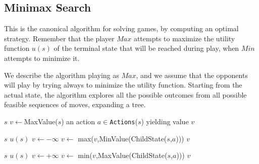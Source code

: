 \documentclass[10pt, letterpaper]{report}
\begin{document}
\subsection{Minimax Search}
This is the canonical algorithm for solving games, by computing an optimal strategy. Remember that the player $Max$ attempts to maximize the utility function $u(s)$ of the terminal state that will be reached during play, when $Min$ attempts to minimize it.\bigskip 

We describe the algorithm playing as $Max$, and we assume that the opponents will play by trying always to minimize the utility function. Starting from the actual state, the algorithm explores all the possible outcomes from all possible feasible sequences of moves, expanding a tree.

 \begin{algorithm}
    \caption{Minimax}\label{alg:minimax}
    \begin{algorithmic}
    \Require $s$
    \State $v\leftarrow$MaxValue($s$)
    \State\Return an action $a\in $\texttt{Actions}($s$) yielding value $v$
    \end{algorithmic}
\end{algorithm}
 \begin{algorithm}
    \caption{MaxValue}\label{alg:MaxValue}
    \begin{algorithmic}
    \Require $s$
    \State\Return $u(s)$
    \EndIf
    \State$v\leftarrow -\infty$
    \State $v\leftarrow$ max($v$,MinValue(ChildState($s$,$a$)))
    \EndFor 
    \State\Return $v$
    \end{algorithmic}
\end{algorithm}
 \begin{algorithm}
    \caption{MinValue}\label{alg:MinValue}
    \begin{algorithmic}
    \Require $s$
    \State\Return $u(s)$
    \EndIf
    \State$v\leftarrow +\infty$
    \State $v\leftarrow$ min($v$,MaxValue(ChildState($s$,$a$)))
    \EndFor 
    \State\Return $v$
    \end{algorithmic}
\end{algorithm}
\end{document}
